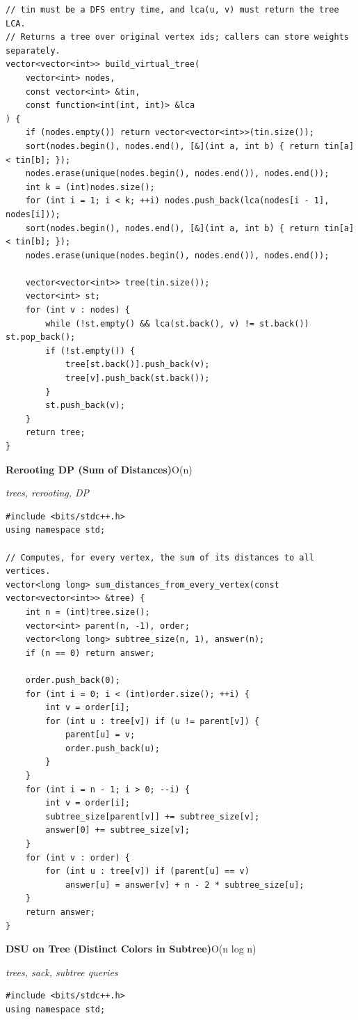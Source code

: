 \documentclass[8pt,a4paper,landscape]{article}
\begin{document}
\begin{multicols}{3}
\begin{lstlisting}
// tin must be a DFS entry time, and lca(u, v) must return the tree LCA.
// Returns a tree over original vertex ids; callers can store weights separately.
vector<vector<int>> build_virtual_tree(
    vector<int> nodes,
    const vector<int> &tin,
    const function<int(int, int)> &lca
) {
    if (nodes.empty()) return vector<vector<int>>(tin.size());
    sort(nodes.begin(), nodes.end(), [&](int a, int b) { return tin[a] < tin[b]; });
    nodes.erase(unique(nodes.begin(), nodes.end()), nodes.end());
    int k = (int)nodes.size();
    for (int i = 1; i < k; ++i) nodes.push_back(lca(nodes[i - 1], nodes[i]));
    sort(nodes.begin(), nodes.end(), [&](int a, int b) { return tin[a] < tin[b]; });
    nodes.erase(unique(nodes.begin(), nodes.end()), nodes.end());

    vector<vector<int>> tree(tin.size());
    vector<int> st;
    for (int v : nodes) {
        while (!st.empty() && lca(st.back(), v) != st.back()) st.pop_back();
        if (!st.empty()) {
            tree[st.back()].push_back(v);
            tree[v].push_back(st.back());
        }
        st.push_back(v);
    }
    return tree;
}
\end{lstlisting}
\vspace{1pt}
\textbf{Rerooting DP (Sum of Distances)}\hfill{\scriptsize O(n)}\par
{\scriptsize\itshape trees, rerooting, DP}\par
\begin{lstlisting}
#include <bits/stdc++.h>
using namespace std;

// Computes, for every vertex, the sum of its distances to all vertices.
vector<long long> sum_distances_from_every_vertex(const vector<vector<int>> &tree) {
    int n = (int)tree.size();
    vector<int> parent(n, -1), order;
    vector<long long> subtree_size(n, 1), answer(n);
    if (n == 0) return answer;

    order.push_back(0);
    for (int i = 0; i < (int)order.size(); ++i) {
        int v = order[i];
        for (int u : tree[v]) if (u != parent[v]) {
            parent[u] = v;
            order.push_back(u);
        }
    }
    for (int i = n - 1; i > 0; --i) {
        int v = order[i];
        subtree_size[parent[v]] += subtree_size[v];
        answer[0] += subtree_size[v];
    }
    for (int v : order) {
        for (int u : tree[v]) if (parent[u] == v)
            answer[u] = answer[v] + n - 2 * subtree_size[u];
    }
    return answer;
}
\end{lstlisting}
\vspace{1pt}
\textbf{DSU on Tree (Distinct Colors in Subtree)}\hfill{\scriptsize O(n log n)}\par
{\scriptsize\itshape trees, sack, subtree queries}\par
\begin{lstlisting}
#include <bits/stdc++.h>
using namespace std;


\end{lstlisting}
\end{multicols}
\end{document}
